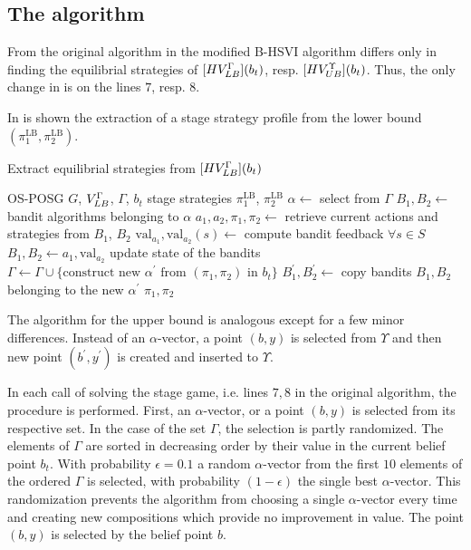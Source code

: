 \documentclass[../main.tex]{subfiles}
\begin{document}
\subsection{The algorithm}\label{new:bhsvi:alg}
From the original algorithm in  the modified B-HSVI algorithm differs only in finding the equilibrial strategies of $[HV_{LB}^{\Gamma}](b_t)$, resp. $[HV_{UB}^{\Upsilon}](b_t)$.
Thus, the only change in  is on the lines $7$, resp. $8$.

In  is shown the extraction of a stage strategy profile from the lower bound $(\pi_1^{\text{LB}},\pi_2^{\text{LB}})$.
\begin{algorithm}
    \caption{Extract equilibrial strategies from $[HV_{LB}^{\Gamma}](b_t)$}
    \label{new:bhsvi:alg:alg:lb}
    \begin{algorithmic}[1]
        \Require OS-POSG $G$, $V_{LB}^{\Gamma}$, $\Gamma$, $b_t$
        \Ensure stage strategies $\pi_1^{\text{LB}}$, $\pi_2^{\text{LB}}$
        \State $\alpha \leftarrow$ select from $\Gamma$
        \State $B_1, B_2 \leftarrow$ bandit algorithms belonging to $\alpha$
        \State $a_1, a_2, \pi_1, \pi_2 \leftarrow$ retrieve current actions and strategies from $B_1$, $B_2$
        \State $\text{val}_{a_1}, \text{val}_{a_2}(s) \leftarrow$ compute bandit feedback $\forall s \in S$
        \State $B_1, B_2 \leftarrow a_1, \text{val}_{a_2}$ update state of the bandits
        \State $\Gamma \leftarrow \Gamma \cup \{\text{construct new } \alpha^{\prime} \text{ from } (\pi_1, \pi_2) \text{ in }b_t\}$
        \State $B_1^{\prime}, B_2^{\prime} \leftarrow$ copy bandits $B_1, B_2$ belonging to the new $\alpha^{\prime}$
        \State\Return $\pi_1, \pi_2$
    \end{algorithmic}
\end{algorithm}
The algorithm for the upper bound is analogous except for a few minor differences.
Instead of an $\alpha$-vector, a point $(b, y)$ is selected from $\Upsilon$ and then new point $(b^{\prime}, y^{\prime})$ is created and inserted to $\Upsilon$.

In each call of solving the stage game, i.e. lines $7, 8$ in the original algorithm, the procedure  is performed.
First, an $\alpha$-vector, or a point $(b, y)$ is selected from its respective set.
In the case of the set $\Gamma$, the selection is partly randomized.
The elements of $\Gamma$ are sorted in decreasing order by their value in the current belief point $b_t$.
With probability $\epsilon = 0.1$ a random $\alpha$-vector from the first $10$ elements of the ordered $\Gamma$ is selected, with probability $(1 - \epsilon)$ the single best $\alpha$-vector.
This randomization prevents the algorithm from choosing a single $\alpha$-vector every time and creating new compositions which provide no improvement in value.
The point $(b, y)$ is selected by the belief point $b$.
\end{document}

